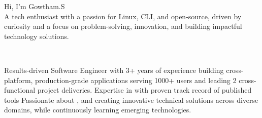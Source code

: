 \documentclass[11pt,a4paper]{article}
\begin{document}
{\headingstyle Hi, I'm {\namefont Gowtham.S}} \\[0.5em]
{\subheadingstyle A tech enthusiast with a passion for Linux, CLI, and open-source, driven by curiosity and a focus on problem-solving, innovation, and building impactful technology solutions.}

{\color{accent}
\small
\noindent
   \quad \textbar{} \quad
   \quad \textbar{} \quad
   \quad \textbar{} \quad
   \quad \quad \\
   \quad \textbar{} \quad
   \quad \textbar{} \quad
}

\divider  %

\begin{body}
Results-driven Software Engineer with 3+ years of experience building cross-platform, production-grade applications serving 1000+ users and leading 2 cross-functional project deliveries. Expertise in {} with proven track record of published tools {} Passionate about {}, and creating innovative technical solutions across diverse domains, while continuously learning emerging technologies.
\end{body}
\end{document}
